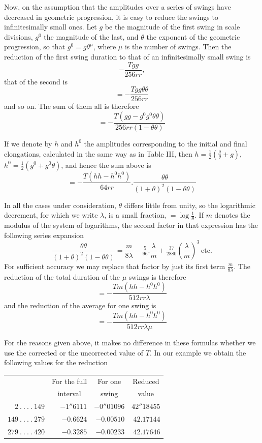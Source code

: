 Now, on the assumption that the amplitudes over a series of swings have decreased in geometric progression, it is easy to reduce the swings to infinitesimally small ones. Let $g$ be the magnitude of the first swing in scale divisions, $g^0$ the magnitude of the last, and $\theta$ the exponent of the geometric progression, so that $g^0=g\theta^\mu$, where $\mu$ is the number of swings. Then the reduction of the first swing duration to that of an infinitesimally small swing is
\[
-\frac{Tgg}{256rr},
\]
that of the second is
\[
=-\frac{Tgg\theta\theta}{256rr}
\]
and so on. The sum of them all is therefore
\[
=-\frac{T(gg-g^0g^0\theta\theta)}{256rr(1-\theta\theta)}
\]

If we denote by $h$ and $h^0$ the amplitudes corresponding to the initial and final elongations, calculated in the same way as in Table III, then $h=\tfrac12(\frac{g}{\theta}+g)$, $h^0=\tfrac12(g^0+g^0\theta)$, and hence the sum above is
\[
=-\frac{T(hh-h^0h^0)}{64rr}.\frac{\theta\theta}{(1+\theta)^2(1-\theta\theta)}
\]

In all the cases under consideration, $\theta$ differs little from unity, so the logarithmic decrement, for which we write $\lambda$, is a small fraction, $=\log\frac1\theta$. If $m$ denotes the modulus of the system of logarithms, the second factor in that expression has the following series expansion
\[
\frac{\theta\theta}{(1+\theta)^2(1-\theta\theta)}=\frac{m}{8\lambda}-\tfrac5{96}.\frac{\lambda}{m}+\tfrac{37}{2880}(\frac{\lambda}{m})^3\ \text{etc.}
\]
For sufficient accuracy we may replace that factor by just its first term $\frac{m}{8\lambda}$. The reduction of the total duration of the $\mu$ swings is therefore
\[
=-\frac{Tm(hh-h^0h^0)}{512rr\lambda}
\]
and the reduction of the average for one swing is
\[
=-\frac{Tm(hh-h^0h^0)}{512rr\lambda\mu}
\]

For the reasons given above, it makes no difference in these formulas whether we use the corrected or the uncorrected value of $T$. In our example we obtain the following values for the reduction
\begin{center}
\fontsize{9}{11}\selectfont
\begin{tabular}{r|r|r|r}
& \multicolumn{1}{c|}{For the full} & \multicolumn{1}{c|}{For one} & \multicolumn{1}{c}{Reduced}\\
& \multicolumn{1}{c|}{interval} & \multicolumn{1}{c|}{swing} & \multicolumn{1}{c}{value}\\[5pt]
$2\ .\ .\ .\ .\ 149$ & $-1''6111$ & $-0''01096$ & $42''18455$\\
$149\ .\ .\ .\ .\ 279$ & $-0.6624$ & $-0.00510$ & $42.17144$\\
$279\ .\ .\ .\ .\ 420$ & $-0.3285$ & $-0.00233$ & $42.17646$
\end{tabular}
\end{center}

